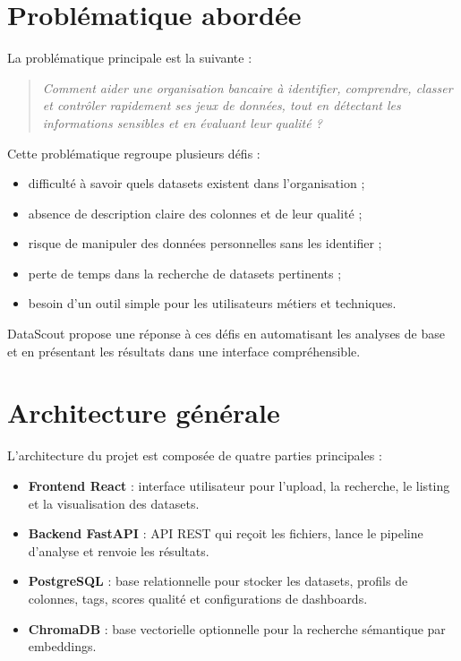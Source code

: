 \documentclass[12pt,a4paper]{report}
\begin{document}
\section{Problématique abordée}

La problématique principale est la suivante :

\begin{quote}
\textit{Comment aider une organisation bancaire à identifier, comprendre, classer et contrôler rapidement ses jeux de données, tout en détectant les informations sensibles et en évaluant leur qualité ?}
\end{quote}

Cette problématique regroupe plusieurs défis :

\begin{itemize}
    \item difficulté à savoir quels datasets existent dans l'organisation ;
    \item absence de description claire des colonnes et de leur qualité ;
    \item risque de manipuler des données personnelles sans les identifier ;
    \item perte de temps dans la recherche de datasets pertinents ;
    \item besoin d'un outil simple pour les utilisateurs métiers et techniques.
\end{itemize}

DataScout propose une réponse à ces défis en automatisant les analyses de base et en présentant les résultats dans une interface compréhensible.

\section{Architecture générale}

L'architecture du projet est composée de quatre parties principales :

\begin{itemize}
    \item \textbf{Frontend React} : interface utilisateur pour l'upload, la recherche, le listing et la visualisation des datasets.
    \item \textbf{Backend FastAPI} : API REST qui reçoit les fichiers, lance le pipeline d'analyse et renvoie les résultats.
    \item \textbf{PostgreSQL} : base relationnelle pour stocker les datasets, profils de colonnes, tags, scores qualité et configurations de dashboards.
    \item \textbf{ChromaDB} : base vectorielle optionnelle pour la recherche sémantique par embeddings.
\end{itemize}
\end{document}
